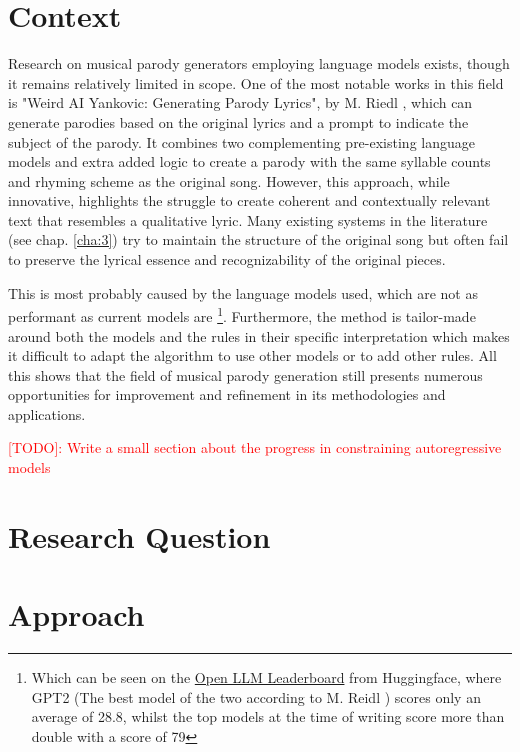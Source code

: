  
\section{Context}
Research on musical parody generators employing language models exists, though it remains relatively limited in scope.
One of the most notable works in this field is "Weird AI Yankovic: Generating Parody Lyrics", by M. Riedl \cite{riedl_weird_2020}, which can generate parodies based on the original lyrics and a prompt to indicate the subject of the parody. 
It combines two complementing pre-existing language models and extra added logic to create a parody with the same syllable counts and rhyming scheme as the original song. 
However, this approach, while innovative, highlights the struggle to create coherent and contextually relevant text that resembles a qualitative lyric. Many existing systems in the literature (see chap. \ref{cha:3}) try to maintain the structure of the original song but often fail to preserve the lyrical essence and recognizability of the original pieces.


This is most probably caused by the language models used, which are not as performant as current models are
\footnote{Which can be seen on the \href{https://huggingface.co/spaces/HuggingFaceH4/open_llm_leaderboard}{Open LLM Leaderboard} from Huggingface, where GPT2 (The best model of the two according to M. Reidl \cite{riedl_weird_2020}) scores only an average of 28.8, whilst the top models at the time of writing score more than double with a score of 79}.
Furthermore, the method is tailor-made around both the models and the rules in their specific interpretation which makes it difficult to adapt the algorithm to use other models or to add other rules. 
All this shows that the field of musical parody generation still presents numerous opportunities for improvement and refinement in its methodologies and applications.

\textcolor{red}{[TODO]: Write a small section about the progress in constraining autoregressive models}



\section{Research Question}

\section{Approach}

